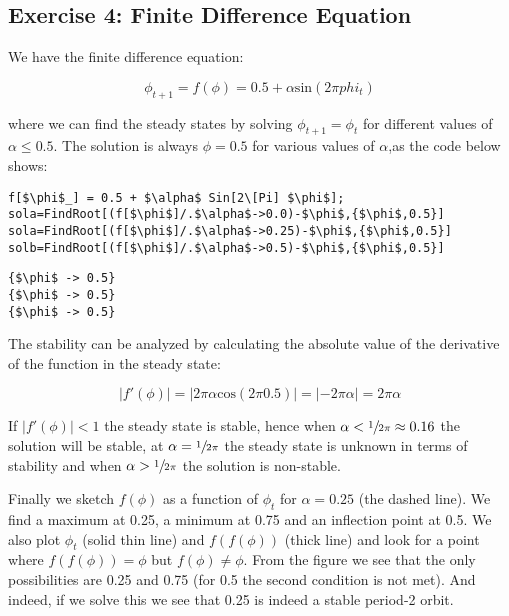 \documentclass[11pt,a4paper,onecolumn]{article}
\begin{document}
\subsection{Exercise 4: Finite Difference Equation}

We have the finite difference equation:

\begin{equation*}
  \phi_{t+1} = f(\phi) = 0.5 + \alpha \text{sin}(2\pi phi_{t})
\end{equation*}

where we can find the steady states by solving $\phi_{t+1} = \phi_{t}$ for different values of $\alpha \leq 0.5$. The solution is always $\phi = 0.5$ for various values of $\alpha$,as the code below shows:

\begin{lstlisting}[mathescape]
f[$\phi$_] = 0.5 + $\alpha$ Sin[2\[Pi] $\phi$];
sola=FindRoot[(f[$\phi$]/.$\alpha$->0.0)-$\phi$,{$\phi$,0.5}]
sola=FindRoot[(f[$\phi$]/.$\alpha$->0.25)-$\phi$,{$\phi$,0.5}]
solb=FindRoot[(f[$\phi$]/.$\alpha$->0.5)-$\phi$,{$\phi$,0.5}]
\end{lstlisting}
\begin{lstlisting}[mathescape]
{$\phi$ -> 0.5}
{$\phi$ -> 0.5}
{$\phi$ -> 0.5}
\end{lstlisting}

The stability can be analyzed by calculating the absolute value of the derivative of the function in the steady state:

\begin{equation*}
  |f'(\phi)| = |2\pi \alpha \text{cos}(2\pi 0.5)| = |-2\pi \alpha| = 2\pi \alpha
\end{equation*}

If $|f'(\phi)| < 1$ the steady state is stable, hence when $\alpha < \sfrac{1}{2\pi} \approx 0.16$ the solution will be stable, at $\alpha = \sfrac{1}{2\pi}$ the steady state is unknown in terms of stability and when $\alpha > \sfrac{1}{2\pi}$ the solution is non-stable.

Finally we sketch $f(\phi)$ as a function of $\phi_t$ for $\alpha = 0.25$ (the dashed line). We find a maximum at 0.25, a minimum at 0.75 and an inflection point at 0.5. We also plot $\phi_t$ (solid thin line) and $f(f(\phi))$ (thick line) and look for a point where $f(f(\phi)) = \phi$ but $f(\phi) \neq \phi$. From the figure we see that the only possibilities are 0.25 and 0.75 (for 0.5 the second condition is not met). And indeed, if we solve this we see that 0.25 is indeed a stable period-2 orbit.
\end{document}
